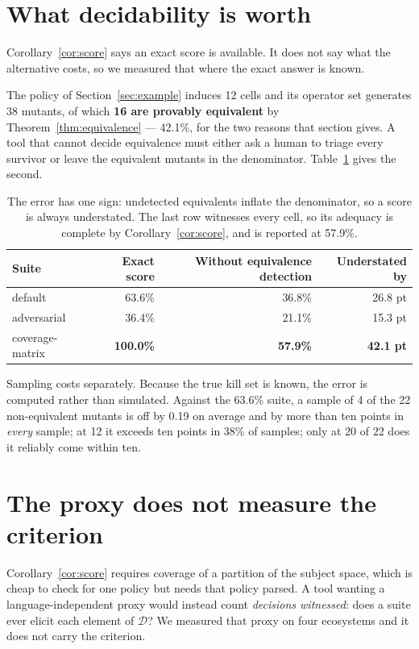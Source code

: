 \documentclass[11pt,a4paper]{article}
\theoremstyle{plain}
\theoremstyle{definition}
\theoremstyle{remark}
\newcommand{\Dom}{\mathcal{D}}
\begin{document}
\section{What decidability is worth}
\label{sec:price}

Corollary~\ref{cor:score} says an exact score is available. It does not say what the
alternative costs, so we measured that where the exact answer is known.

The policy of Section~\ref{sec:example} induces 12 cells and its operator set generates 38
mutants, of which \textbf{16 are provably equivalent} by Theorem~\ref{thm:equivalence} ---
42.1\%, for the two reasons that section gives. A tool that cannot decide equivalence must
either ask a human to triage every survivor or leave the equivalent mutants in the
denominator. Table~\ref{tab:price} gives the second.

\begin{table}[t]
\centering
\begin{tabular}{lrrr}
\toprule
Suite & Exact score & Without equivalence detection & Understated by \\
\midrule
default & 63.6\% & 36.8\% & 26.8 pt \\
adversarial & 36.4\% & 21.1\% & 15.3 pt \\
coverage-matrix & \textbf{100.0\%} & \textbf{57.9\%} & \textbf{42.1 pt} \\
\bottomrule
\end{tabular}
\caption{The error has one sign: undetected equivalents inflate the denominator, so a score
is always understated. The last row witnesses every cell, so its adequacy is complete by
Corollary~\ref{cor:score}, and is reported at 57.9\%.}
\label{tab:price}
\end{table}

Sampling costs separately. Because the true kill set is known, the error is computed rather
than simulated. Against the 63.6\% suite, a sample of 4 of the 22 non-equivalent mutants is
off by 0.19 on average and by more than ten points in \emph{every} sample; at 12 it exceeds
ten points in 38\% of samples; only at 20 of 22 does it reliably come within ten.

\section{The proxy does not measure the criterion}
\label{sec:negative}

Corollary~\ref{cor:score} requires coverage of a partition of the subject space, which is
cheap to check for one policy but needs that policy parsed. A tool wanting a
language-independent proxy would instead count \emph{decisions witnessed}: does a suite ever
elicit each element of $\Dom$? We measured that proxy on four ecosystems and it does not
carry the criterion.
\end{document}
